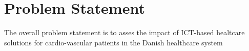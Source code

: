 \chapter{Problem Statement}

The overall problem statement is to asses the impact of ICT-based healtcare solutions for cardio-vascular patients in the Danish healthcare system




